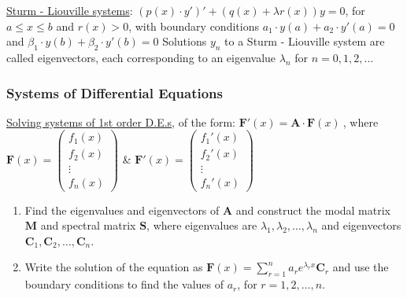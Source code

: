 \documentclass[12pt]{article}
\begin{document}
\begin{flushleft}
	\textbullet \quad \uline{Sturm - Liouville systems}: $\displaystyle (p(x) \cdot y')' + ( q(x) + \lambda r(x)) y = 0$, for $a \leq x \leq b$ and $r(x) > 0$, with boundary conditions $\displaystyle a_1 \cdot y(a) + a_2 \cdot y'(a) = 0$ and $\displaystyle \beta_1 \cdot y(b) + \beta_2 \cdot y'(b) = 0$ \linebreak 
	Solutions $y_n$ to a Sturm - Liouville system are called eigenvectors, each corresponding to an eigenvalue $\lambda_n$ for $n = 0,1,2, \ldots$ \linebreak 
	
	\subsubsection{Systems of Differential Equations}
	
	\textbullet \quad \uline{Solving systems of 1st order D.E.s}, of the form: \linebreak 
	$\displaystyle \textbf{F}'(x) = \textbf{A} \cdot \textbf{F}(x)\ $, where $\displaystyle \textbf{F}(x) = \begin{pmatrix}
		f_1(x) \\ f_2(x) \\ \vdots \\ f_n(x)
	\end{pmatrix}$ \& $\displaystyle \textbf{F}'(x) = \begin{pmatrix} f_1'(x) \\ f_2'(x) \\ \vdots \\ f_n'(x) \end{pmatrix} $  
	\begin{enumerate}
	\item Find the eigenvalues and eigenvectors of $\textbf{A}$ and construct the modal matrix $\textbf{M}$ and spectral matrix $\textbf{S}$, where eigenvalues are $\lambda_1, \lambda_2, \ldots, \lambda_n$ and eigenvectors $\textbf{C}_1, \textbf{C}_2, \ldots, \textbf{C}_n$. 
	\item Write the solution of the equation as $\displaystyle \textbf{F}(x) = \sum \limits_{r=1}^n a_r e^{\lambda_r x} \textbf{C}_r$ and use the boundary conditions to find the values of $a_r$, for $r=1,2,\ldots, n$.
	\end{enumerate} 
	

\end{flushleft}
\end{document}
